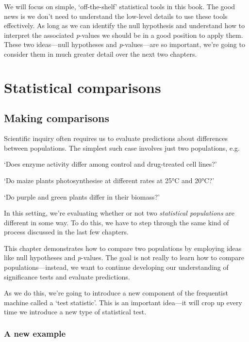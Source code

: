 \documentclass[
]{book}
\begin{document}
We will focus on simple, `off-the-shelf' statistical tools in this book. The good news is we don't need to understand the low-level details to use these tools effectively. As long as we can identify the null hypothesis and understand how to interpret the associated \emph{p}-values we should be in a good position to apply them. These two ideas---null hypotheses and \emph{p}-values---are so important, we're going to consider them in much greater detail over the next two chapters.

\hypertarget{statistical-comparisons}{%
\chapter{Statistical comparisons}\label{statistical-comparisons}}

\hypertarget{making-comparisons}{%
\section{Making comparisons}\label{making-comparisons}}

Scientific inquiry often requires us to evaluate predictions about differences between populations. The simplest such case involves just two populations, e.g.

`Does enzyme activity differ among control and drug-treated cell lines?'

`Do maize plants photosynthesise at different rates at 25°C and 20°C?'

`Do purple and green plants differ in their biomass?'

In this setting, we're evaluating whether or not two \emph{statistical populations} are different in some way. To do this, we have to step through the same kind of process discussed in the last few chapters.

This chapter demonstrates how to compare two populations by employing ideas like null hypotheses and \emph{p}-values. The goal is not really to learn how to compare populations---instead, we want to continue developing our understanding of significance tests and evaluate predictions.

As we do this, we're going to introduce a new component of the frequentist machine called a `test statistic'. This is an important idea---it will crop up every time we introduce a new type of statistical test.

\hypertarget{morph-weights-eg}{%
\subsection{A new example}\label{morph-weights-eg}}
\end{document}
